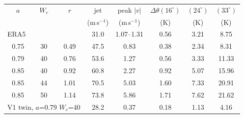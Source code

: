 {\small
\begin{tabular}{cccccccc}
\toprule
$a$ & $W_c$ & $r$ & jet & peak $|v|$ & $\Delta\theta(16^\circ)$ & $(24^\circ)$ & $(33^\circ)$\\
 & & & (m\,s$^{-1}$) & (m\,s$^{-1}$) & (K) & (K) & (K)\\
\midrule
\multicolumn{3}{l}{ERA5} & 31.0 & 1.07--1.31 & 0.56 & 3.21 & 8.75\\
\midrule
0.75 & 30 & 0.49 & 47.5 & 0.83 & 0.38 & 2.34 & 8.31\\
0.79 & 40 & 0.76 & 53.6 & 1.27 & 0.56 & 3.33 & 11.33\\
0.85 & 40 & 0.92 & 60.8 & 2.27 & 0.92 & 5.07 & 15.96\\
0.85 & 44 & 1.01 & 70.5 & 5.03 & 1.60 & 7.33 & 20.91\\
0.85 & 50 & 1.14 & 73.8 & 5.86 & 1.71 & 7.62 & 21.62\\
\multicolumn{3}{l}{V1 twin, $a$=0.79 $W_c$=40} & 28.2 & 0.37 & 0.18 & 1.13 & 4.16\\
\bottomrule
\end{tabular}
}
